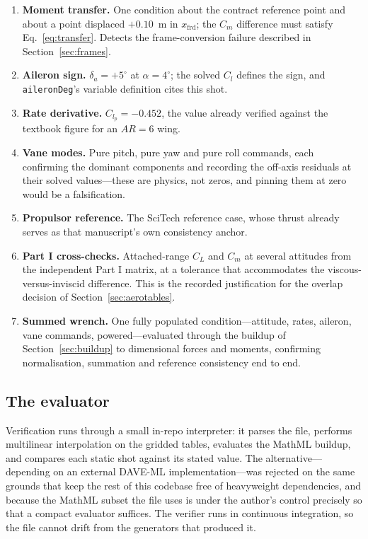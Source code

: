 \documentclass[11pt,a4paper]{article}
\newcommand{\varid}[1]{\texttt{\small #1}}
\newcommand{\dg}{^\circ}
\begin{document}
\begin{enumerate}
\item \textbf{Moment transfer.} One condition about the contract
reference point and about a point displaced $+0.10$~m in
$x_{\mathrm{frd}}$; the $C_m$ difference must satisfy
Eq.~\eqref{eq:transfer}. Detects the frame-conversion failure described
in Section~\ref{sec:frames}.
\item \textbf{Aileron sign.} $\delta_a = +5\dg$ at $\alpha = 4\dg$; the
solved $C_l$ defines the sign, and \varid{aileronDeg}'s variable
definition cites this shot.
\item \textbf{Rate derivative.} $C_{l_p} = -0.452$, the value already
verified against the textbook figure for an
$A\!R = 6$ wing.
\item \textbf{Vane modes.} Pure pitch, pure yaw and pure roll commands,
each confirming the dominant components and recording the off-axis
residuals at their solved values---these are physics, not zeros, and
pinning them at zero would be a falsification.
\item \textbf{Propulsor reference.} The SciTech reference case, whose
thrust already serves as that manuscript's own consistency anchor.
\item \textbf{Part I cross-checks.} Attached-range $C_L$ and $C_m$ at
several attitudes from the independent Part I matrix, at a tolerance
that accommodates the viscous-versus-inviscid difference. This is the
recorded justification for the overlap decision of
Section~\ref{sec:aerotables}.
\item \textbf{Summed wrench.} One fully populated condition---attitude,
rates, aileron, vane commands, powered---evaluated through the buildup of
Section~\ref{sec:buildup} to dimensional forces and moments, confirming
normalisation, summation and reference consistency end to end.
\end{enumerate}

\subsection{The evaluator}

Verification runs through a small in-repo interpreter: it parses the
file, performs multilinear interpolation on the gridded tables, evaluates
the MathML buildup, and compares each static shot against its stated
value. The alternative---depending on an external DAVE-ML
implementation---was rejected on the same grounds that keep the rest of
this codebase free of heavyweight dependencies, and because the MathML
subset the file uses is under the author's control precisely so that a
compact evaluator suffices. The verifier runs in continuous integration,
so the file cannot drift from the generators that produced it.
\end{document}
